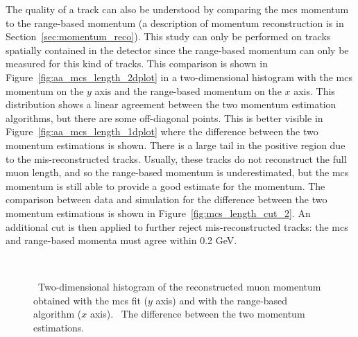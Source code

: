 The quality of a track can also be understood by comparing the \acrshort{mcs} momentum to the range-based momentum (a description of momentum reconstruction is in Section~\ref{sec:momentum_reco}). 
This study can only be performed on tracks spatially contained in the detector since the range-based momentum can only be measured for this kind of tracks.
This comparison is shown in Figure~\ref{fig:aa_mcs_length_2dplot} in a two-dimensional histogram with the \acrshort{mcs} momentum on the $y$ axis and the range-based momentum on the $x$ axis. This distribution shows a linear agreement between the two momentum estimation algorithms, but there are some off-diagonal points. This is better visible in Figure~\ref{fig:aa_mcs_length_1dplot} where the difference between the two momentum estimations is shown. There is a large tail in the positive region due to the mis-reconstructed tracks. Usually, these tracks do not reconstruct the full muon length, and so the range-based momentum is underestimated, but the \acrshort{mcs} momentum is still able to provide a good estimate for the momentum. The comparison between data and simulation for the difference between the two momentum estimations is shown in Figure~\ref{fig:mcs_length_cut_2}. An additional cut is then applied to further reject mis-reconstructed tracks: the \acrshort{mcs} and range-based momenta must agree within 0.2 GeV. 

\begin{figure}[]
\centering
{}
 \\
\caption[\acrshort{mcs} and Range-Based Momentum in Simulation]{\protect{}~Two-dimensional histogram of the reconstructed muon momentum obtained with the \acrshort{mcs} fit ($y$ axis) and with the range-based algorithm ($x$ axis). \protect{}~The difference between the two momentum estimations.}
\label{fig:mcs_length_cut}
\end{figure}

